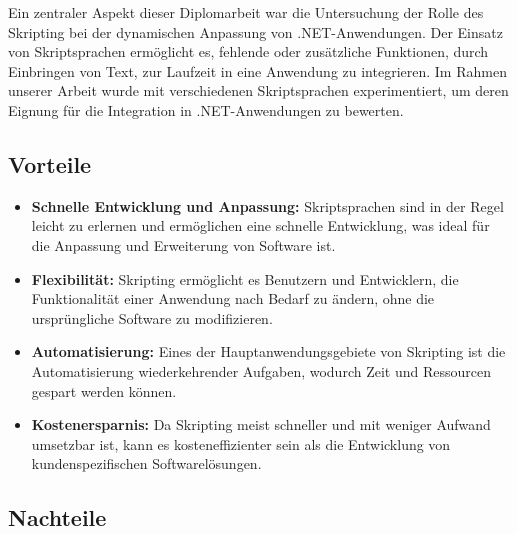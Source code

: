 Ein zentraler Aspekt dieser Diplomarbeit war die Untersuchung der Rolle des Skripting 
bei der dynamischen Anpassung von .NET-Anwendungen. Der Einsatz von Skriptsprachen ermöglicht es, 
fehlende oder zusätzliche Funktionen, durch Einbringen von Text, zur Laufzeit in eine Anwendung 
zu integrieren. Im Rahmen unserer Arbeit wurde mit verschiedenen Skriptsprachen experimentiert, 
um deren Eignung für die Integration in .NET-Anwendungen zu bewerten.

\subsection*{Vorteile}

\begin{itemize}
    \item \textbf{Schnelle Entwicklung und Anpassung:} Skriptsprachen sind in der Regel 
    leicht zu erlernen und ermöglichen eine schnelle Entwicklung, was ideal für die 
    Anpassung und Erweiterung von Software ist.
    \item \textbf{Flexibilität:} Skripting ermöglicht es Benutzern und Entwicklern, 
    die Funktionalität einer Anwendung nach Bedarf zu ändern, ohne die ursprüngliche 
    Software zu modifizieren.
    \item \textbf{Automatisierung:} Eines der Hauptanwendungsgebiete von Skripting ist 
    die Automatisierung wiederkehrender Aufgaben, wodurch Zeit und Ressourcen 
    gespart werden können.
    \item \textbf{Kostenersparnis:} Da Skripting meist schneller und mit weniger 
    Aufwand umsetzbar ist, kann es kosteneffizienter sein als die Entwicklung von 
    kundenspezifischen Softwarelösungen.
\end{itemize}

\newpage

\subsection*{Nachteile}

